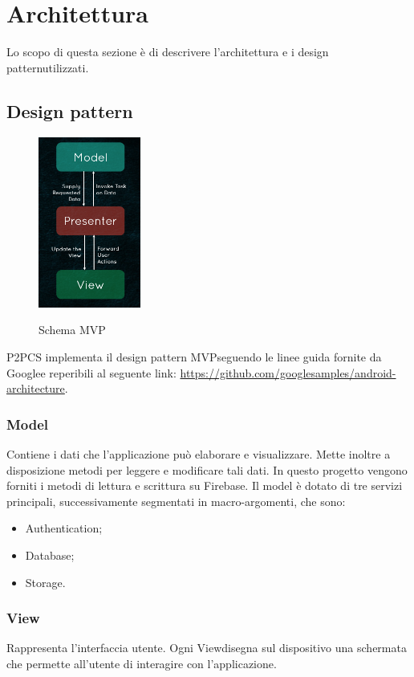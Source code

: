 \section{Architettura}
Lo scopo di questa sezione è di descrivere l'architettura e i design pattern\glosp utilizzati.
\subsection{Design pattern}
\begin{figure}[H]
	\centering
	\includegraphics[width=0.3\textwidth]
	{res/images/mvp.png}\\
	\caption{Schema MVP}
	\label{Schema MVP}
\end{figure}
P2PCS implementa il design pattern MVP\glosp seguendo le linee guida fornite da Google\glosp e reperibili al seguente link: \url{https://github.com/googlesamples/android-architecture}.
\newline
\subsubsection{Model}
Contiene i dati che l’applicazione può elaborare e visualizzare. Mette inoltre a disposizione metodi per leggere e modificare tali dati.
In questo progetto vengono forniti i metodi di lettura e scrittura su Firebase\glo.
Il model è dotato di tre servizi principali, successivamente segmentati in macro-argomenti, che sono:
\begin{itemize}
	\item Authentication;
	\item Database;
	\item Storage.
\end{itemize}
\subsubsection{View}
Rappresenta l’interfaccia utente. Ogni View\glosp disegna sul dispositivo una schermata che permette all'utente di interagire con l’applicazione.
